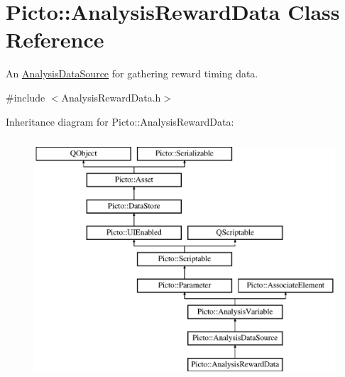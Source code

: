 \hypertarget{class_picto_1_1_analysis_reward_data}{\section{Picto\-:\-:Analysis\-Reward\-Data Class Reference}
\label{class_picto_1_1_analysis_reward_data}
}


An \hyperlink{class_picto_1_1_analysis_data_source}{Analysis\-Data\-Source} for gathering reward timing data.  




{\ttfamily \#include $<$Analysis\-Reward\-Data.\-h$>$}

Inheritance diagram for Picto\-:\-:Analysis\-Reward\-Data\-:\begin{figure}[H]
\begin{center}
\leavevmode
\includegraphics[height=9.000000cm]{class_picto_1_1_analysis_reward_data}
\end{center}
\end{figure}
